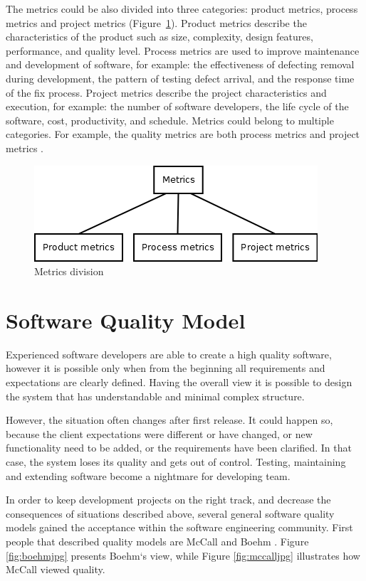 The metrics could be also divided into three categories: product metrics, process metrics and project metrics (Figure~\ref{fig:metrics2}). Product metrics describe the characteristics of the product such as size, complexity, design features, performance, and quality level. Process metrics are used to improve maintenance and development of software, for example: the effectiveness of defecting removal during development, the pattern of testing defect arrival, and the response time of the fix process. Project metrics describe the project characteristics and execution, for example: the number of software developers, the life cycle of the software, cost, productivity, and schedule. Metrics could belong to multiple categories. For example, the quality metrics are both process metrics and project metrics \cite{metrics}. 

\begin{figure}[h!]
	\centering
	\includegraphics[scale=0.5]{img/Diagram2.png} 
	\caption{Metrics division}		
	\label{fig:metrics2}
\end{figure}


\section{Software Quality Model}
Experienced software developers are able to create a high quality software, however it is possible only when from the beginning all requirements and expectations are clearly defined. Having the overall view it is possible to design the system that has understandable and minimal complex structure. 

However, the situation often changes after first release. It could happen so, because the client expectations were different or have changed, or new functionality need to be added, or the requirements have been clarified. In that case, the system loses its quality and gets out of control. Testing, maintaining and extending software become a nightmare for developing team. 

In order to keep development projects on the right track, and decrease the consequences of situations described above, several general software quality models gained the acceptance within the software engineering community. First people that described quality models are McCall and Boehm \cite{rigorous}. Figure \ref{fig:boehmjpg} presents Boehm`s view, while Figure \ref{fig:mccalljpg} illustrates how McCall viewed quality.

